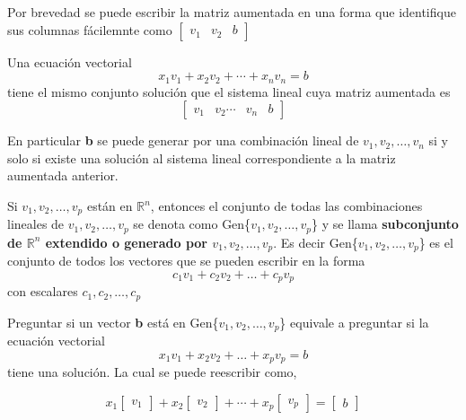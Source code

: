 \documentclass{article}
\begin{document}
Por brevedad se puede escribir la matriz aumentada en una forma que identifique sus columnas fácilemnte como $\begin{bmatrix} \textbf{$v_1$} & \textbf{$v_2$} & b \end{bmatrix}$

\begin{tcolorbox}[colback=green!20!white,colframe=green!80!black,title=Ecuación Vectorial y Sistema lineal]
    Una ecuación vectorial $$x_1\textbf{$v_1$} + x_2\textbf{$v_2$} + \dotsb + x_n\textbf{$v_n$} = \textbf{$b$}$$ tiene el mismo conjunto solución que el sistema lineal cuya matriz aumentada es $$\begin{bmatrix} \textbf{$v_1$} & \textbf{$v_2$} \dotsb & \textbf{$v_n$} & b \end{bmatrix}$$

    En particular \textbf{b} se puede generar por una combinación lineal de $v_1, v_2,\dots, v_n$ si y solo si existe una solución al sistema lineal correspondiente a la matriz aumentada anterior.
\end{tcolorbox}

\begin{tcolorbox}[colback=blue!10!white,colframe=blue!60!black,title=Conjunto de Combinaciones Lineales]
    Si $v_1,v_2,\dots, v_p$ están en $\mathbb{R}^n$, entonces el conjunto de todas las combinaciones lineales de $v_1,v_2,\dots, v_p$ se denota como Gen\{$v_1,v_2,\dots, v_p$\} y se llama \textbf{subconjunto de $\mathbb{R}^n$ extendido o generado por $v_1,v_2,\dots, v_p$}. Es decir Gen\{$v_1,v_2,\dots, v_p$\} es el conjunto de todos los vectores que se pueden escribir en la forma $$c_1v_1 + c_2v_2 + \dots + c_pv_p$$
    con escalares $c_1,c_2,\dots, c_p$
\end{tcolorbox}

Preguntar si un vector \textbf{b} está en Gen\{$v_1,v_2,\dots, v_p$\} equivale a preguntar si la ecuación vectorial $$x_1v_1 + x_2v_2 + \dots + x_pv_p = b$$ tiene una solución. La cual se puede reescribir como, 

\begin{equation*}
    x_1 \begin{bmatrix} v_1 \end{bmatrix} 
    +x_2 \begin{bmatrix} v_2 \end{bmatrix}
    + \dotsb + x_p \begin{bmatrix} v_p \end{bmatrix}
    = \begin{bmatrix} b \end{bmatrix}
\end{equation*}
\end{document}
